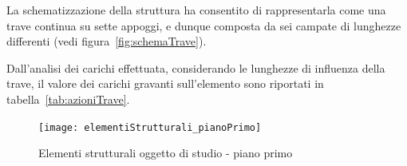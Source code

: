 La schematizzazione della struttura ha consentito di rappresentarla come una trave continua su sette appoggi, e dunque composta da sei campate di lunghezze differenti (vedi figura~\ref{fig:schemaTrave}).

Dall'analisi dei carichi effettuata, considerando le lunghezze di influenza della trave, il valore dei carichi gravanti sull'elemento sono riportati in tabella~\ref{tab:azioniTrave}.

\begin{table}
\caption{Riepilogo dei carichi agenti sulla trave}  
\label{tab:azioniTrave}
%
\end{table}

\begin{figure}
\centering
 \texttt{[image: elementiStrutturali\_pianoPrimo]}
 \caption{Elementi strutturali oggetto di studio - piano primo}
 \label{fig:elementiStrutturali_pianoPrimo}
\end{figure}


